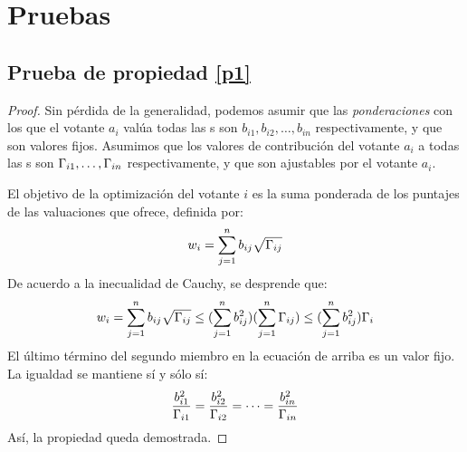 \section{Pruebas}
\subsection{Prueba de propiedad \ref{p1}}
\label{subsection:proof1}
\begin{proof}
	Sin pérdida de la generalidad, podemos asumir que las \textit{ponderaciones} con los que el votante $a_i$
	valúa todas las {\dapp}s son $b_{i1}, b_{i2}, \ldots, b_{in}$ respectivamente, y que son valores fijos. Asumimos que los valores de contribución del votante $a_i$ a todas las {\dapp}s son
	$\Gamma_{i1},\ldots,\Gamma_{in}$ respectivamente, y que son ajustables por el votante $a_i$.

	El objetivo de la optimización del votante $i$ es la suma ponderada de los puntajes de las valuaciones que ofrece, definida por:
	$$w_i = \sum_{j=1}^n b_{ij}\sqrt{\Gamma_{ij}}$$
	De acuerdo a la inecualidad de Cauchy, se desprende que:
	$$w_i = \sum_{j=1}^n b_{ij}\sqrt{\Gamma_{ij}} \leq (\sum_{j=1}^n b_{ij}^2)(\sum_{j=1}^n \Gamma_{ij}) \leq (\sum_{j=1}^n b_{ij}^2)\Gamma_i$$
	El último término del segundo miembro en la ecuación de arriba es un valor fijo. La igualdad se mantiene sí y sólo sí:
	$$\frac{b_{i1}^2}{\Gamma_{i1}}=\frac{b_{i2}^2}{\Gamma_{i2}}=\cdots=\frac{b_{in}^2}{\Gamma_{in}}$$
	Así, la propiedad queda demostrada.
\end{proof}

